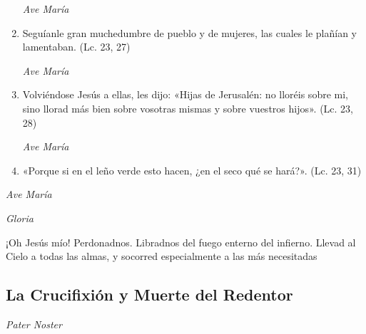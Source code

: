 \documentclass[a4paper,11pt, oneside]{report}
\begin{document}
\begin{enumerate}
          \textit{Ave María}

          \item Seguíanle gran muchedumbre de pueblo y de mujeres, las cuales le plañían y lamentaban. (Lc. 23, 27)

          \textit{Ave María}

          \item Volviéndose Jesús a ellas, les dijo: «Hijas de Jerusalén: no lloréis sobre mi, sino llorad más bien sobre vosotras mismas y sobre
          vuestros hijos». (Lc. 23, 28)

          \textit{Ave María}

          \item «Porque si en el leño verde esto hacen, ¿en el seco qué se hará?». (Lc. 23, 31)

        \end{enumerate}

        \textit{Ave María} \par
        \indent\textit{Gloria} \par
        \indent¡Oh Jesús mío! Perdonadnos. Libradnos del fuego enterno del infierno. Llevad al Cielo a todas las almas, y socorred especialmente a las más 
        necesitadas

      \subsection*{La Crucifixión y Muerte del Redentor}
      
        \textit{Pater Noster}
\end{document}
